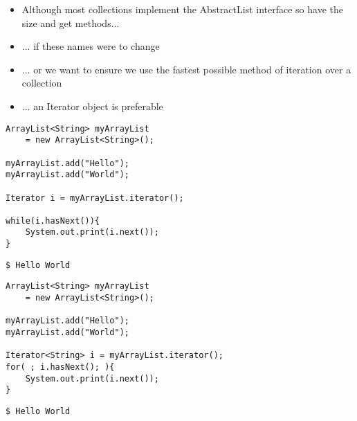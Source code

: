 \documentclass{beamer}
\begin{document}
\begin{frame}
\begin{itemize}
\item Although most collections implement the AbstractList interface so have the size and get methods...
\item ... if these names were to change
\item ... or we want to ensure we use the fastest possible method of iteration over a collection
\item ... an Iterator object is preferable
\end{itemize}
\end{frame} 

\begin{frame}[fragile]
\begin{block}{}
\begin{lstlisting}
ArrayList<String> myArrayList 
    = new ArrayList<String>();

myArrayList.add("Hello");
myArrayList.add("World");

Iterator i = myArrayList.iterator();
        
while(i.hasNext()){
    System.out.print(i.next());
}
\end{lstlisting}
\end{block}

\begin{block}{}
\begin{lstlisting}
$ Hello World
\end{lstlisting}
\end{block}
\end{frame} 

\begin{frame}[fragile]
\begin{block}{}
\begin{lstlisting}
ArrayList<String> myArrayList 
    = new ArrayList<String>();

myArrayList.add("Hello");
myArrayList.add("World");

Iterator<String> i = myArrayList.iterator();
for( ; i.hasNext(); ){
    System.out.print(i.next());
}
\end{lstlisting}
\end{block}

\begin{block}{}
\begin{lstlisting}
$ Hello World
\end{lstlisting}
\end{block}
\end{frame} 
\end{document}
